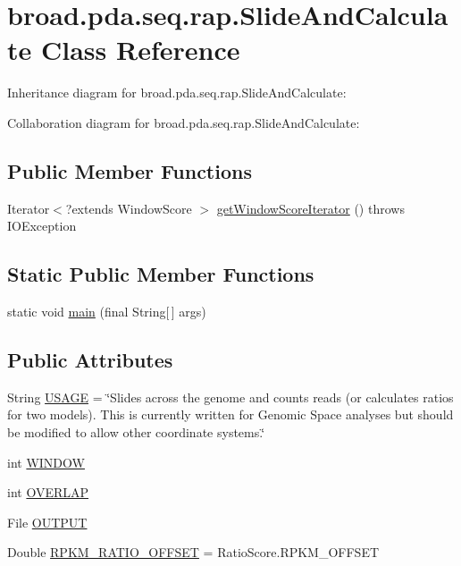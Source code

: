 \hypertarget{classbroad_1_1pda_1_1seq_1_1rap_1_1_slide_and_calculate}{\section{broad.\+pda.\+seq.\+rap.\+Slide\+And\+Calculate Class Reference}
\label{classbroad_1_1pda_1_1seq_1_1rap_1_1_slide_and_calculate}
}


Inheritance diagram for broad.\+pda.\+seq.\+rap.\+Slide\+And\+Calculate\+:


Collaboration diagram for broad.\+pda.\+seq.\+rap.\+Slide\+And\+Calculate\+:
\subsection*{Public Member Functions}
\begin{DoxyCompactItemize}
\item 
Iterator$<$?extends Window\+Score $>$ \hyperlink{classbroad_1_1pda_1_1seq_1_1rap_1_1_slide_and_calculate_a34ca6d1e9be4800f5af03612256c29b8}{get\+Window\+Score\+Iterator} ()  throws I\+O\+Exception 
\end{DoxyCompactItemize}
\subsection*{Static Public Member Functions}
\begin{DoxyCompactItemize}
\item 
static void \hyperlink{classbroad_1_1pda_1_1seq_1_1rap_1_1_slide_and_calculate_af094b5191043d4dfcbc334e846e6ce05}{main} (final String\mbox{[}$\,$\mbox{]} args)
\end{DoxyCompactItemize}
\subsection*{Public Attributes}
\begin{DoxyCompactItemize}
\item 
String \hyperlink{classbroad_1_1pda_1_1seq_1_1rap_1_1_slide_and_calculate_a664325284c4f1d73adbc6d642db4ef09}{U\+S\+A\+G\+E} = \char`\"{}Slides across the genome and counts reads (or calculates ratios for two models). This is currently written for Genomic Space analyses but should be modified to allow other coordinate systems.\char`\"{}
\item 
int \hyperlink{classbroad_1_1pda_1_1seq_1_1rap_1_1_slide_and_calculate_ac2b84e21fea216344c7142f303ce012d}{W\+I\+N\+D\+O\+W}
\item 
int \hyperlink{classbroad_1_1pda_1_1seq_1_1rap_1_1_slide_and_calculate_a7ca886fb6f7f66f2d5c80ae3a17af302}{O\+V\+E\+R\+L\+A\+P}
\item 
File \hyperlink{classbroad_1_1pda_1_1seq_1_1rap_1_1_slide_and_calculate_a0c43d0a43289ec33c47209f0d069e770}{O\+U\+T\+P\+U\+T}
\item 
Double \hyperlink{classbroad_1_1pda_1_1seq_1_1rap_1_1_slide_and_calculate_a3d4828962f7c369cc3aeedd5d43828ed}{R\+P\+K\+M\+\_\+\+R\+A\+T\+I\+O\+\_\+\+O\+F\+F\+S\+E\+T} = Ratio\+Score.\+R\+P\+K\+M\+\_\+\+O\+F\+F\+S\+E\+T
\end{DoxyCompactItemize}
